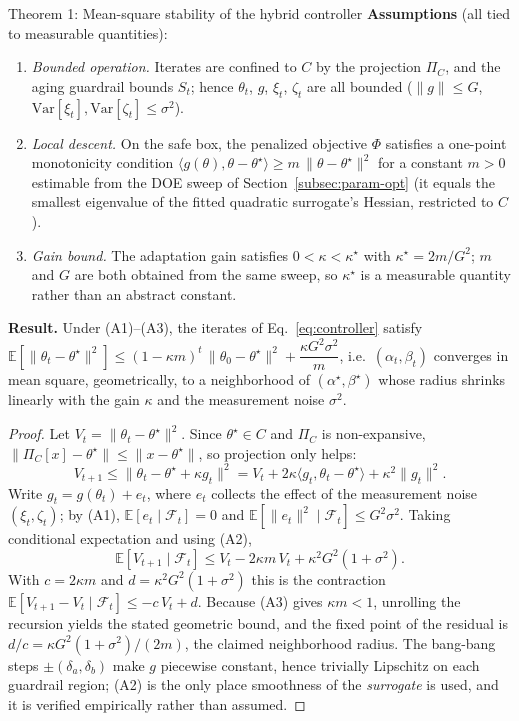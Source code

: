 \begin{mytheorem}{Theorem 1: Mean-square stability of the hybrid controller}
\textbf{Assumptions} (all tied to measurable quantities):
\begin{enumerate}
  \item[(A1)] \emph{Bounded operation.} Iterates are confined to $C$ by the projection $\Pi_C$, and the aging guardrail bounds $S_t$; hence $\theta_t$, $g$, $\xi_t$, $\zeta_t$ are all bounded ($\|g\|\le G$, $\mathrm{Var}[\xi_t],\mathrm{Var}[\zeta_t]\le\sigma^2$).
  \item[(A2)] \emph{Local descent.} On the safe box, the penalized objective $\Phi$ satisfies a one-point monotonicity condition $\langle g(\theta),\theta-\theta^\star\rangle \ge m\,\|\theta-\theta^\star\|^2$ for a constant $m>0$ estimable from the DOE sweep of Section~\ref{subsec:param-opt} (it equals the smallest eigenvalue of the fitted quadratic surrogate's Hessian, restricted to $C$).
  \item[(A3)] \emph{Gain bound.} The adaptation gain satisfies $0<\kappa<\kappa^\star$ with $\kappa^\star = 2m/G^2$; $m$ and $G$ are both obtained from the same sweep, so $\kappa^\star$ is a measurable quantity rather than an abstract constant.
\end{enumerate}
\textbf{Result.} Under (A1)--(A3), the iterates of Eq.~\eqref{eq:controller} satisfy
$\mathbb{E}\!\left[\|\theta_t-\theta^\star\|^2\right]\le (1-\kappa m)^t\,\|\theta_0-\theta^\star\|^2 + \dfrac{\kappa G^2\sigma^2}{m}$,
i.e.\ $(\alpha_t,\beta_t)$ converges in mean square, geometrically, to a neighborhood of $(\alpha^\star,\beta^\star)$ whose radius shrinks linearly with the gain $\kappa$ and the measurement noise $\sigma^2$.
\end{mytheorem}

\begin{proof}
Let $V_t=\|\theta_t-\theta^\star\|^2$. Since $\theta^\star\in C$ and $\Pi_C$ is non-expansive, $\|\Pi_C[x]-\theta^\star\|\le\|x-\theta^\star\|$, so projection only helps:
\[
V_{t+1}\le \|\theta_t-\theta^\star+\kappa g_t\|^2
= V_t + 2\kappa\langle g_t,\theta_t-\theta^\star\rangle + \kappa^2\|g_t\|^2 .
\]
Write $g_t = g(\theta_t) + e_t$, where $e_t$ collects the effect of the measurement noise $(\xi_t,\zeta_t)$; by (A1), $\mathbb{E}[e_t\mid\mathcal{F}_t]=0$ and $\mathbb{E}[\|e_t\|^2\mid\mathcal{F}_t]\le G^2\sigma^2$. Taking conditional expectation and using (A2),
\[
\mathbb{E}[V_{t+1}\mid\mathcal{F}_t]\le V_t - 2\kappa m\,V_t + \kappa^2 G^2(1+\sigma^2).
\]
With $c=2\kappa m$ and $d=\kappa^2 G^2(1+\sigma^2)$ this is the contraction $\mathbb{E}[V_{t+1}-V_t\mid\mathcal{F}_t]\le -c\,V_t + d$. Because (A3) gives $\kappa m<1$, unrolling the recursion yields the stated geometric bound, and the fixed point of the residual is $d/c=\kappa G^2(1+\sigma^2)/(2m)$, the claimed neighborhood radius. The bang-bang steps $\pm(\delta_a,\delta_b)$ make $g$ piecewise constant, hence trivially Lipschitz on each guardrail region; (A2) is the only place smoothness of the \emph{surrogate} is used, and it is verified empirically rather than assumed.
\end{proof}

